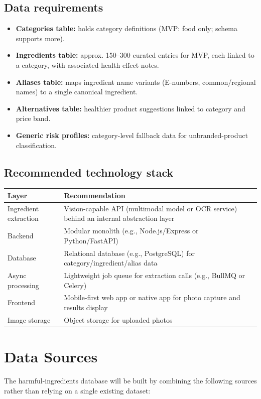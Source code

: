 \documentclass[11pt,a4paper]{article}
\begin{document}
\subsection{Data requirements}
\begin{itemize}
  \item \textbf{Categories table:} holds category definitions (MVP: food only; schema supports more).
  \item \textbf{Ingredients table:} approx. 150--300 curated entries for MVP, each linked to a category, with associated health-effect notes.
  \item \textbf{Aliases table:} maps ingredient name variants (E-numbers, common/regional names) to a single canonical ingredient.
  \item \textbf{Alternatives table:} healthier product suggestions linked to category and price band.
  \item \textbf{Generic risk profiles:} category-level fallback data for unbranded-product classification.
\end{itemize}

\subsection{Recommended technology stack}
\begin{longtable}{@{}p{3.6cm}p{10cm}@{}}
\toprule
\textbf{Layer} & \textbf{Recommendation} \\
\midrule
\endhead
Ingredient extraction & Vision-capable API (multimodal model or OCR service) behind an internal abstraction layer \\
Backend & Modular monolith (e.g., Node.js/Express or Python/FastAPI) \\
Database & Relational database (e.g., PostgreSQL) for category/ingredient/alias data \\
Async processing & Lightweight job queue for extraction calls (e.g., BullMQ or Celery) \\
Frontend & Mobile-first web app or native app for photo capture and results display \\
Image storage & Object storage for uploaded photos \\
\bottomrule
\end{longtable}

\section{Data Sources}
The harmful-ingredients database will be built by combining the following sources rather than relying on a single existing dataset:
\end{document}

